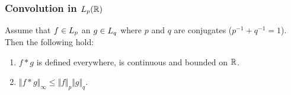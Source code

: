 

\begin{frame}
\frametitle{Convolution in $L_{p}(\mathbb{R})$}
\begin{theorem}
Assume that $f\in L_{p}$ an $g\in L_{q}$ where $p$ and $q$ are conjugates ($p^{-1} + q^{-1}=1$).
Then the following hold:
\begin{enumerate}[label=(\roman*)]
\item $f*g$  is defined everywhere, is continuous  and  bounded on $\mathbb{R}$.
\item $\Vert f*g\Vert_{\infty}\leq\Vert f\Vert_{p}\Vert g\Vert_{q}$.
\end{enumerate}
\end{theorem}
\end{frame}

